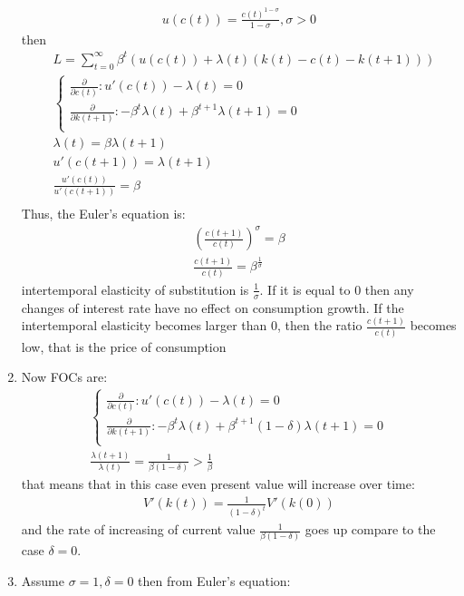 \documentclass[a4paper]{article}
\begin{document}
\begin{enumerate}
\begin{align*}
	u(c(t)) = \frac{c(t)^{1 - \sigma}}{1 - \sigma}, \sigma > 0
\end{align*}
then
\begin{align*}
&L = \sum_{t=0}^{\infty} \beta^t(u(c(t)) + \lambda(t)(k(t) - c(t) - k(t+1)))\\
&\begin{cases}\frac{\partial}{\partial c(t)}: u'(c(t)) - \lambda(t) = 0\\
\frac{\partial}{\partial k(t+1)}: -\beta^t \lambda(t) + \beta^{t+1}\lambda(t+1) = 0\\
\end{cases}\\
&\lambda(t) = \beta \lambda(t+1)\\
&u'(c(t+1)) = \lambda(t+1)\\
&\frac{u'(c(t))}{u'(c(t+1))} = \beta\\
\end{align*}
Thus, the Euler's equation is:
\begin{align*}
\left(\frac{c(t+1)}{c(t)}\right)^{\sigma} = \beta\\
\frac{c(t+1)}{c(t)} = \beta^{\frac{1}{\sigma}}
\end{align*}
intertemporal elasticity of substitution is $\frac{1}{\sigma}$. If it is equal to 0 then any changes of interest rate have no effect on consumption growth. If the intertemporal elasticity becomes larger than 0, then the ratio $\frac{c(t+1)}{c(t)}$ becomes low, that is the price of consumption 
\item Now FOCs are:
\begin{align*}
\begin{cases}\frac{\partial}{\partial c(t)}: u'(c(t)) - \lambda(t) = 0\\
\frac{\partial}{\partial k(t+1)}: -\beta^t \lambda(t) + \beta^{t+1}(1 - \delta)\lambda(t+1) = 0\\
\end{cases}\\
\frac{\lambda(t+1)}{\lambda(t)} = \frac{1}{\beta(1 - \delta)} > \frac{1}{\beta}
\end{align*}
that means that in this case even present value will increase over time:
\begin{align*}
V'(k(t)) = \frac{1}{(1 - \delta)^t}V'(k(0))
\end{align*}
and the rate of increasing of current value $\frac{1}{\beta(1-\delta)}$ goes up compare to the case $\delta = 0$.
\item Assume $\sigma = 1, \delta = 0$ then
from Euler's equation:
\begin{align*}

\end{align*}
\end{enumerate}
\end{document}
